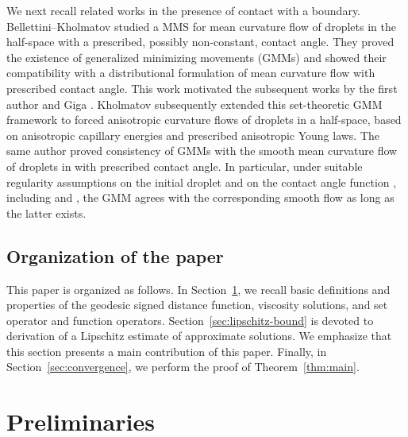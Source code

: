 \documentclass[11pt]{article}
\makeatletter
\numberwithin{equation}{section}
\newcommand{\R}{\mathbb{R}}
\newcounter{mathrecordid}
\newcommand{\mathboxbegin}[1]{%
  \stepcounter{mathrecordid}%
  \immediate\write\mathrecords{\themathrecordid,#1}%
  \special{pdf:bann << /Type /Annot /Subtype /Link /Border [0 0 0]
    /MathBoxID \themathrecordid /F 2
    /A << /S /URI /URI (urn:mathbox:\themathrecordid) >> >>}}
\newcommand{\mathboxinlineplain}[1]{$#1$}
\newcommand{\mathboxinline}[1]{%
  $\mathboxbegin{inline}#1\special{pdf:eann}$}
\newcommand{\recordmath}{%
  \ifmeasuring@\expandafter\mathboxinlineplain
  \else\expandafter\mathboxinline\fi}
\makeatother
\begin{document}
We next recall related works in the presence of contact with a boundary.
Bellettini--Kholmatov \cite{BK18} studied a MMS for mean curvature flow of droplets in the half-space \recordmath{\mathbb{R}^d_+} with a prescribed, possibly non-constant, contact angle.  They proved the existence of generalized minimizing movements (GMMs) and showed their compatibility with a distributional formulation of mean curvature flow with prescribed contact angle.  This work motivated the subsequent works by the first author and Giga \cite{EG24,EG25}.
Kholmatov \cite{K25-2} subsequently extended this set-theoretic GMM framework to forced anisotropic curvature flows of droplets in a half-space, based on anisotropic capillary energies and prescribed anisotropic Young laws.
The same author \cite{Kholmatov25} proved consistency of GMMs with the smooth mean curvature flow of droplets in \recordmath{\mathbb{R}^3_+} with prescribed contact angle.  In particular, under suitable regularity assumptions on the initial droplet and on the contact angle function \recordmath{\beta}, including \recordmath{\beta\in C^{1+\alpha}(\partial\R^3_+)} and \recordmath{\|\beta\|_{C^0(\partial\R^3_+)}<1}, the GMM agrees with the corresponding smooth flow as long as the latter exists.



\subsection*{Organization of the paper}
This paper is organized as follows. In Section~\ref{sec:preliminaries},
we recall basic definitions and properties of the geodesic signed distance function, viscosity solutions, and set operator and function operators. 
Section~\ref{sec:lipschitz-bound} is devoted to derivation of a Lipschitz estimate of approximate solutions. We emphasize that this section presents a main contribution of this paper.
Finally, in Section~\ref{sec:convergence}, we perform the proof of Theorem~\ref{thm:main}.

\section{Preliminaries}
\label{sec:preliminaries}
\end{document}
